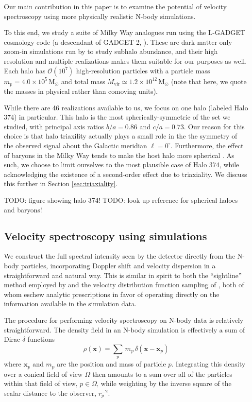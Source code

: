 \documentclass[aps,prl,10pt,twocolumn,superscriptaddress,showpacs]{revtex4-1}
\newcommand{\bvec}[1]{\mathbf{#1}}
\begin{document}
Our main contribution in this paper is to examine the potential of velocity spectroscopy using
more physically realistic N-body simulations.

To this end, we study a suite of Milky Way analogues run using the L-GADGET cosmology code
(a descendant of GADGET-2, \cite{springel2005}). These are dark-matter-only zoom-in simulations 
run by \cite{mao2015} to study subhalo abundance, and their high resolution and multiple
realizations makes them suitable for our purposes as well. Each halo has $\mathcal{O}(10^7)$
high-resolution particles with a particle mass $m_p=4.0\times10^5\, \mathrm{M_{\odot}}$ and total 
mass $M_{\mathrm{vir}}\simeq1.2\times10^{12}\,\mathrm{M_{\odot}}$ (note that here, we quote the masses in physical rather than comoving
units).

While there are 46 realizations available to us, we focus on one halo (labeled Halo 374) in particular. 
This halo is the most spherically-symmetric of the set we studied, with principal axis ratios
$b/a=0.86$ and $c/a=0.73$. Our reason for this choice is that halo triaxility actually plays a small role
in the the symmetry of the observed signal about the Galactic meridian $\ell=0^{\circ}$. Furthermore, the effect of baryons in the Milky Way tends to make the host
halo more spherical \cite{}. As such, we choose to limit ourselves to the most plausible case of
Halo 374, while acknowledging the existence of a second-order effect due to triaxiality. 
We discuss this further in Section \ref{sec:triaxiality}.

TODO: figure showing halo 374!
TODO: look up reference for spherical haloes and baryons!

\subsection{Velocity spectroscopy using simulations}
\label{sec:simulations}

We construct the full
spectral intensity seen by the detector directly from the N-body particles, incorporating Doppler shift
and velocity dispersion in a straightforward and natural way.   This is similar in spirit to both the ``sightline'' method employed by 
\cite{lovell2015} and the velocity distribution function sampling of \cite{mao2013}, both of whom
eschew analytic prescriptions in favor of operating directly on the information available in the
simulation data. 

The procedure for performing velocity spectroscopy on N-body data is relatively straightforward.
The density field in an N-body simulation is effectively a sum of Dirac-$\delta$ functions
$$
\rho(\bvec{x}) = \sum_p\, m_p\, \delta(\bvec{x}-\bvec{x}_p)
$$
where $\bvec{x}_p$ and $m_p$ are the position and mass of particle $p$. Integrating this density over a conical
field of view $\Omega$ then amounts to a sum over all of the particles within that field of view, $p \in
\Omega$, while weighting by the inverse square of the scalar distance to the observer, $r^{-2}_p$. 
\end{document}
